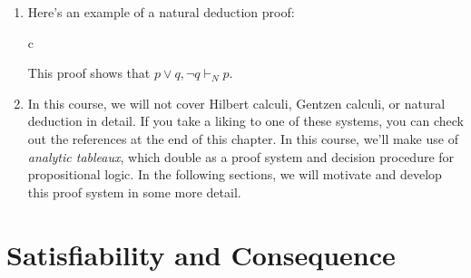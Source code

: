\begin{enumerate}[\thesection.1]
	\item Here's an example of a natural deduction proof:
	\begin{center}
			\begin{tabular}{c}
			\end{tabular}
		\end{center}	
	This proof shows that $p\lor q,\neg q\vdash_N p$.

	\item In this course, we will not cover Hilbert calculi, Gentzen calculi, or natural deduction in detail. If you take a liking to one of these systems, you can check out the references at the end of this chapter. In this course, we'll make use of \emph{analytic tableaux}, which double as a proof system and decision procedure for propositional logic. In the following sections, we will motivate and develop this proof system in some more detail.

	\end{enumerate}
	

\section{Satisfiability and Consequence}

